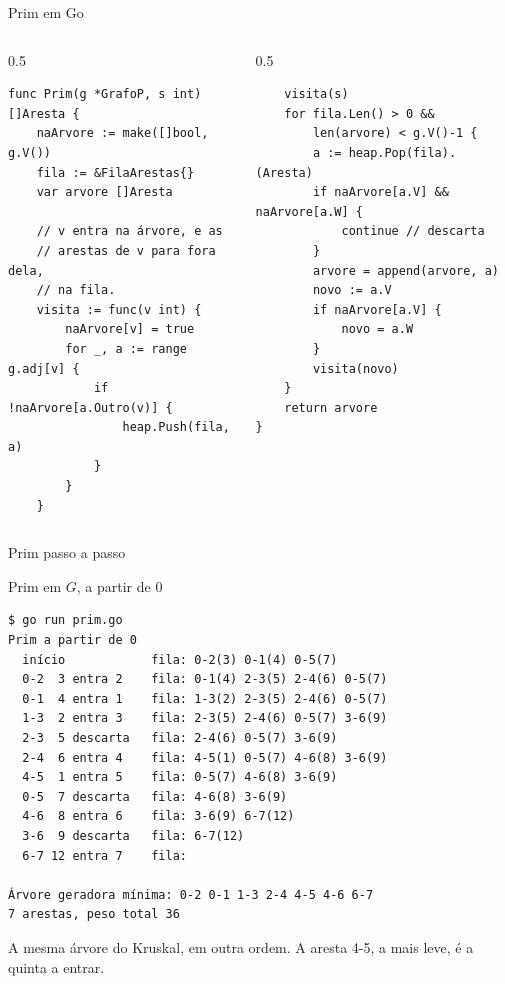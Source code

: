 \documentclass{beamer}
\begin{document}
\begin{frame}[fragile]{Prim em Go}
	\begin{columns}[T,onlytextwidth]
		\begin{column}{0.5\textwidth}
			\begin{verbatim}
func Prim(g *GrafoP, s int) []Aresta {
	naArvore := make([]bool, g.V())
	fila := &FilaArestas{}
	var arvore []Aresta

	// v entra na árvore, e as
	// arestas de v para fora dela,
	// na fila.
	visita := func(v int) {
		naArvore[v] = true
		for _, a := range g.adj[v] {
			if !naArvore[a.Outro(v)] {
				heap.Push(fila, a)
			}
		}
	}
\end{verbatim}
		\end{column}
		\begin{column}{0.5\textwidth}
			\begin{verbatim}
	visita(s)
	for fila.Len() > 0 &&
		len(arvore) < g.V()-1 {
		a := heap.Pop(fila).(Aresta)
		if naArvore[a.V] && naArvore[a.W] {
			continue // descarta
		}
		arvore = append(arvore, a)
		novo := a.V
		if naArvore[a.V] {
			novo = a.W
		}
		visita(novo)
	}
	return arvore
}
\end{verbatim}
		\end{column}
	\end{columns}
\end{frame}

\begin{frame}{Prim passo a passo}
	\begin{center}
	\end{center}
\end{frame}

\begin{frame}[fragile]{Prim em $G$, a partir de 0}
	\begin{verbatim}
$ go run prim.go
Prim a partir de 0
  início            fila: 0-2(3) 0-1(4) 0-5(7)
  0-2  3 entra 2    fila: 0-1(4) 2-3(5) 2-4(6) 0-5(7)
  0-1  4 entra 1    fila: 1-3(2) 2-3(5) 2-4(6) 0-5(7)
  1-3  2 entra 3    fila: 2-3(5) 2-4(6) 0-5(7) 3-6(9)
  2-3  5 descarta   fila: 2-4(6) 0-5(7) 3-6(9)
  2-4  6 entra 4    fila: 4-5(1) 0-5(7) 4-6(8) 3-6(9)
  4-5  1 entra 5    fila: 0-5(7) 4-6(8) 3-6(9)
  0-5  7 descarta   fila: 4-6(8) 3-6(9)
  4-6  8 entra 6    fila: 3-6(9) 6-7(12)
  3-6  9 descarta   fila: 6-7(12)
  6-7 12 entra 7    fila:

Árvore geradora mínima: 0-2 0-1 1-3 2-4 4-5 4-6 6-7
7 arestas, peso total 36
\end{verbatim}
	\footnotesize
	A mesma árvore do Kruskal, em outra ordem. A aresta 4-5, a mais leve, é
	a quinta a entrar.
\end{frame}
\end{document}
